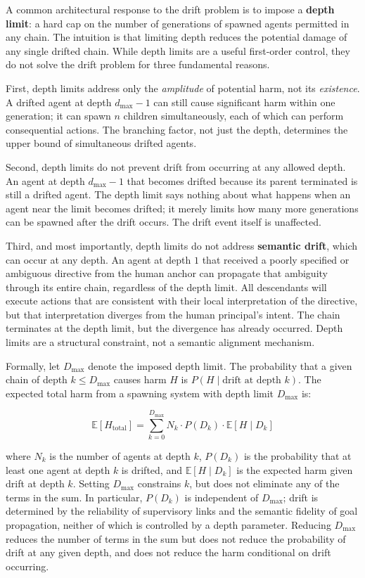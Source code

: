 A common architectural response to the drift problem is to impose a \textbf{depth limit}: a hard cap on the number of generations of spawned agents permitted in any chain. The intuition is that limiting depth reduces the potential damage of any single drifted chain. While depth limits are a useful first-order control, they do not solve the drift problem for three fundamental reasons.

First, depth limits address only the \textit{amplitude} of potential harm, not its \textit{existence}. A drifted agent at depth $d_{\max} - 1$ can still cause significant harm within one generation; it can spawn $n$ children simultaneously, each of which can perform consequential actions. The branching factor, not just the depth, determines the upper bound of simultaneous drifted agents.

Second, depth limits do not prevent drift from occurring at any allowed depth. An agent at depth $d_{\max} - 1$ that becomes drifted because its parent terminated is still a drifted agent. The depth limit says nothing about what happens when an agent near the limit becomes drifted; it merely limits how many more generations can be spawned after the drift occurs. The drift event itself is unaffected.

Third, and most importantly, depth limits do not address \textbf{semantic drift}, which can occur at any depth. An agent at depth $1$ that received a poorly specified or ambiguous directive from the human anchor can propagate that ambiguity through its entire chain, regardless of the depth limit. All descendants will execute actions that are consistent with their local interpretation of the directive, but that interpretation diverges from the human principal's intent. The chain terminates at the depth limit, but the divergence has already occurred. Depth limits are a structural constraint, not a semantic alignment mechanism.

Formally, let $D_{\max}$ denote the imposed depth limit. The probability that a given chain of depth $k \leq D_{\max}$ causes harm $H$ is $P(H \mid \text{drift at depth } k)$. The expected total harm from a spawning system with depth limit $D_{\max}$ is:

\[
\mathbb{E}[H_{\text{total}}] = \sum_{k=0}^{D_{\max}} N_k \cdot P(D_k) \cdot \mathbb{E}[H \mid D_k]
\]

where $N_k$ is the number of agents at depth $k$, $P(D_k)$ is the probability that at least one agent at depth $k$ is drifted, and $\mathbb{E}[H \mid D_k]$ is the expected harm given drift at depth $k$. Setting $D_{\max}$ constrains $k$, but does not eliminate any of the terms in the sum. In particular, $P(D_k)$ is independent of $D_{\max}$; drift is determined by the reliability of supervisory links and the semantic fidelity of goal propagation, neither of which is controlled by a depth parameter. Reducing $D_{\max}$ reduces the number of terms in the sum but does not reduce the probability of drift at any given depth, and does not reduce the harm conditional on drift occurring.

